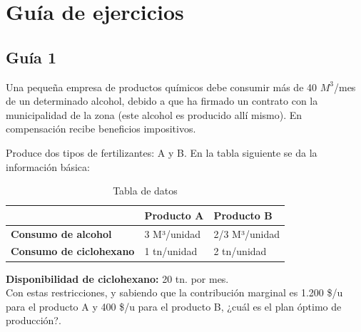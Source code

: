 \documentclass[../main.tex]{subfiles}
\begin{document}
\section{Guía de ejercicios} 
    \subsection{Guía 1}
        \setcounter{section}{1} %
        \begin{exercise} 
            Una pequeña empresa de productos químicos debe consumir más de 40 $M^3$/mes de un determinado alcohol, debido a que ha firmado un contrato con la municipalidad de la zona (este alcohol es producido allí mismo). En compensación recibe beneficios impositivos. 
            
            Produce dos tipos de fertilizantes: A y B. En la tabla siguiente se da la información básica:
            \begin{table}[ht]
                \centering
                \begin{tabular}{l|l|l|}
                \cline{2-3}
                                                &  \textbf{Producto A} & \textbf{Producto B} \\ \hline
                \multicolumn{1}{|l|}{\textbf{Consumo de alcohol}} & 3 M³/unidad & 2/3 M³/unidad \\ \hline
                \multicolumn{1}{|l|}{\textbf{Consumo de ciclohexano}} & 1 tn/unidad & 2 tn/unidad \\ \hline
                \end{tabular}
                \caption{Tabla de datos}
            \end{table}

            \textbf{Disponibilidad de ciclohexano:} 20 tn. por mes.\\

            Con estas restricciones, y sabiendo que la contribución marginal es 1.200 \$/u para el producto A y 400 \$/u para el producto B, ¿cuál es el plan óptimo de producción?.\\


\end{exercise}
\end{document}
